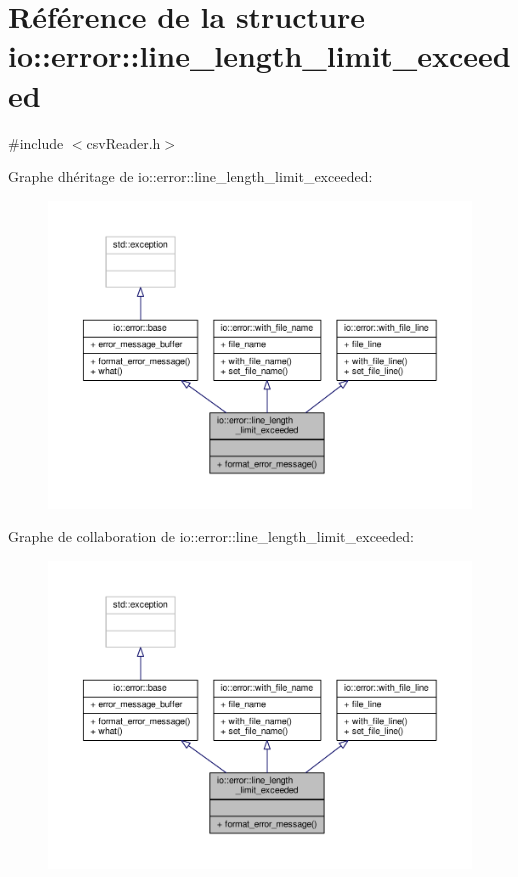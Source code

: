 \hypertarget{structio_1_1error_1_1line__length__limit__exceeded}{}\section{Référence de la structure io\+:\+:error\+:\+:line\+\_\+length\+\_\+limit\+\_\+exceeded}
\label{structio_1_1error_1_1line__length__limit__exceeded}


{\ttfamily \#include $<$csv\+Reader.\+h$>$}



Graphe d\textquotesingle{}héritage de io\+:\+:error\+:\+:line\+\_\+length\+\_\+limit\+\_\+exceeded\+:\nopagebreak
\begin{figure}[H]
\begin{center}
\leavevmode
\includegraphics[width=350pt]{structio_1_1error_1_1line__length__limit__exceeded__inherit__graph}
\end{center}
\end{figure}


Graphe de collaboration de io\+:\+:error\+:\+:line\+\_\+length\+\_\+limit\+\_\+exceeded\+:\nopagebreak
\begin{figure}[H]
\begin{center}
\leavevmode
\includegraphics[width=350pt]{structio_1_1error_1_1line__length__limit__exceeded__coll__graph}
\end{center}
\end{figure}
